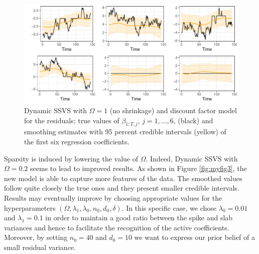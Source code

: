 \documentclass[
  12pt,
]{book}
\theoremstyle{break}
\theoremstyle{nonumberplain}
\begin{document}
\begin{figure}[H]

{\centering \includegraphics{Dynamic-Shrinkage-in-Bayesian-Structural-Time-Series-and-Vector-Autoregressive-Models_files/figure-latex/myfig2-1} 

}

\caption{Dynamic SSVS with $\Omega=1$ (no shrinkage) and discount factor model for the residuals; true values of $\beta_{1:T, j}$, $j=1, \ldots, 6$, (black) and smoothing estimates with 95 percent credible intervals (yellow) of the first six regression coefficients.}\label{fig:myfig2}
\end{figure}

Sparsity is induced by lowering the value of \(\Omega\). Indeed, Dynamic
SSVS with \(\Omega=0.2\) seems to lead to improved results. As shown in
Figure \ref{fig:myfig3}, the new model is able to capture more features
of the data. The smoothed values follow quite closely the true ones and
they present smaller credible intervals. Results may eventually improve
by choosing appropriate values for the hyperparameters
\((\Omega,\lambda_{1},\lambda_0,n_{0},d_{0},\delta)\). In this specific
case, we chose \(\lambda_{0}=0.01\) and \(\lambda_{1}=0.1\) in order to
maintain a good ratio between the spike and slab variances and hence to
facilitate the recognition of the active coefficients. Moreover, by
setting \(n_0=40\) and \(d_0=10\) we want to express our prior belief of
a small residual variance.
\end{document}
